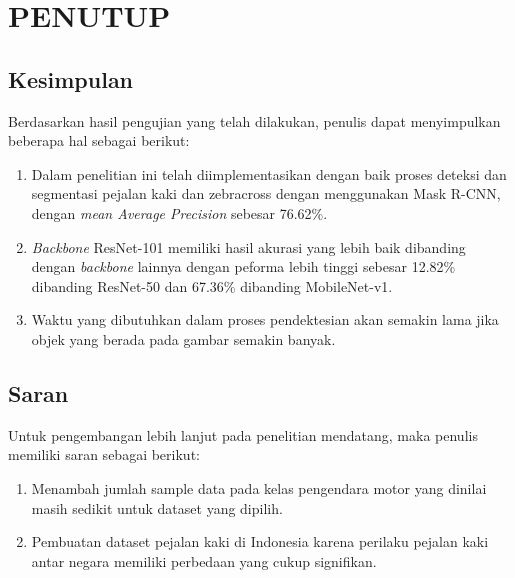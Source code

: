 \chapter{PENUTUP}
\label{chap:penutup}


\section{Kesimpulan}
\label{sec:kesimpulan}

Berdasarkan hasil pengujian yang telah dilakukan, penulis dapat menyimpulkan beberapa hal sebagai berikut:

\begin{enumerate}[nolistsep]

  \item Dalam penelitian ini telah diimplementasikan dengan baik proses deteksi dan segmentasi pejalan kaki dan zebracross dengan menggunakan Mask R-CNN, dengan \textit{mean Average Precision} sebesar 76.62\%.
  \item \textit{Backbone} ResNet-101 memiliki hasil akurasi yang lebih baik dibanding dengan \textit{backbone} lainnya dengan peforma lebih tinggi sebesar 12.82\% dibanding ResNet-50 dan 67.36\% dibanding MobileNet-v1. 
  \item Waktu yang dibutuhkan dalam proses pendektesian akan semakin lama jika objek yang berada pada gambar semakin banyak.
  
\end{enumerate}

\section{Saran}
\label{sec:saran}

Untuk pengembangan lebih lanjut pada penelitian mendatang, maka penulis memiliki saran sebagai berikut:

\begin{enumerate}[nolistsep]

  \item Menambah jumlah sample data pada kelas pengendara motor yang dinilai masih sedikit untuk dataset yang dipilih.

  \item Pembuatan dataset pejalan kaki di Indonesia karena perilaku pejalan kaki antar negara memiliki perbedaan yang cukup signifikan.

\end{enumerate}
